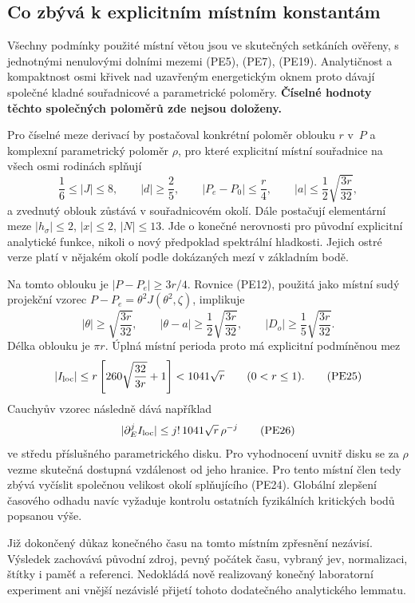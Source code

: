 \documentclass[11pt,a4paper]{article}
\theoremstyle{remark}\newtheorem{remark}[theorem]{Poznámka}
\numberwithin{equation}{section}
\begin{document}
\subsection{Co zbývá k explicitním místním konstantám}

Všechny podmínky použité místní větou jsou ve skutečných
setkáních ověřeny, s jednotnými nenulovými dolními mezemi
(PE5), (PE7), (PE19). Analytičnost a kompaktnost osmi křivek
nad uzavřeným energetickým oknem proto dávají společné kladné
souřadnicové a parametrické poloměry.
\textbf{Číselné hodnoty těchto společných poloměrů zde nejsou
doloženy.}

Pro číselné meze derivací by postačoval konkrétní poloměr
oblouku \(r\) v~\(P\) a komplexní parametrický poloměr
\(\rho\), pro které explicitní místní souřadnice na všech
osmi rodinách splňují
\[
\frac16\le|J|\le8,\qquad |d|\ge\frac25,\qquad
|P_e-P_0|\le\frac r4,\qquad
|a|\le\frac12\sqrt{\frac{3r}{32}},
\tag{PE24}
\]
a zvednutý oblouk zůstává v souřadnicovém okolí. Dále postačují
elementární meze \(|h_\sigma|\le2\), \(|x|\le2\),
\(|N|\le13\). Jde o konečné nerovnosti pro původní explicitní
analytické funkce, nikoli o nový předpoklad spektrální hladkosti.
Jejich ostré verze platí v nějakém okolí podle dokázaných mezí
v základním bodě.

Na tomto oblouku je \(|P-P_e|\ge3r/4\). Rovnice (PE12),
použitá jako místní sudý projekční vzorec
\(P-P_e=\theta^2J(\theta^2,\zeta)\), implikuje
\[
|\theta|\ge\sqrt{\frac{3r}{32}},\qquad
|\theta-a|\ge\frac12\sqrt{\frac{3r}{32}},\qquad
|D_o|\ge\frac15\sqrt{\frac{3r}{32}}.
\]
Délka oblouku je \(\pi r\). Úplná místní perioda proto má
explicitní podmíněnou mez
\[
|I_{\rm loc}|
\le r\left[260\sqrt{\frac{32}{3r}}+1\right]
<1041\sqrt r\qquad(0<r\le1).
\tag{PE25}
\]
Cauchyův vzorec následně dává například
\[
|\partial_E^j I_{\rm loc}|
\le j!\,1041\sqrt r\,\rho^{-j}
\tag{PE26}
\]
ve středu příslušného parametrického disku. Pro vyhodnocení
uvnitř disku se za \(\rho\) vezme skutečná dostupná vzdálenost
od jeho hranice. Pro tento místní člen tedy zbývá vyčíslit společnou velikost
okolí splňujícího (PE24).
Globální zlepšení časového odhadu navíc vyžaduje kontrolu
ostatních fyzikálních kritických bodů popsanou výše.

Již dokončený důkaz konečného času na tomto místním zpřesnění
nezávisí. Výsledek zachovává původní zdroj, pevný počátek času,
vybraný jev, normalizaci, štítky i paměť a referenci. Nedokládá
nově realizovaný konečný laboratorní experiment ani vnější
nezávislé přijetí tohoto dodatečného analytického lemmatu.
\end{document}
